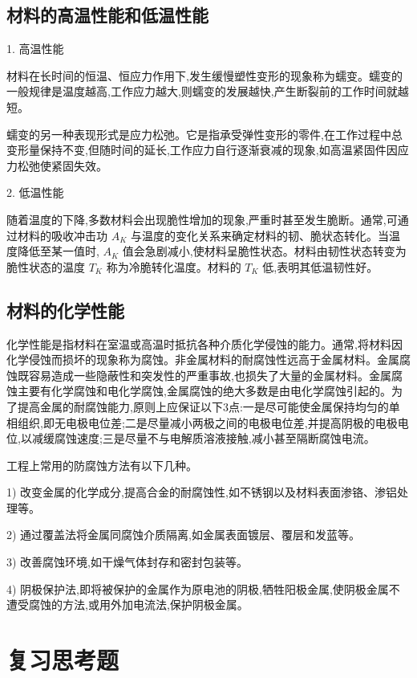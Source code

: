 \documentclass[UTF8]{ctexbook}
\newcommand{\◎}{\ensuremath{\bigcirc}}
\begin{document}
\subsection{材料的高温性能和低温性能}

1. 高温性能

材料在长时间的恒温、恒应力作用下,发生缓慢塑性变形的现象称为蠕变。蠕变的一般规律是温度越高,工作应力越大,则蠕变的发展越快,产生断裂前的工作时间就越短。

蠕变的另一种表现形式是应力松弛。它是指承受弹性变形的零件,在工作过程中总变形量保持不变,但随时间的延长,工作应力自行逐渐衰减的现象,如高温紧固件因应力松弛使紧固失效。

2. 低温性能

随着温度的下降,多数材料会出现脆性增加的现象,严重时甚至发生脆断。通常,可通过材料的吸收冲击功 $A_K$ 与温度的变化关系来确定材料的韧、脆状态转化。当温度降低至某一值时, $A_K$ 值会急剧减小,使材料呈脆性状态。材料由韧性状态转变为脆性状态的温度 $T_K$ 称为冷脆转化温度。材料的 $T_K$ 低,表明其低温韧性好。

\subsection{材料的化学性能}

化学性能是指材料在室温或高温时抵抗各种介质化学侵蚀的能力。通常,将材料因化学侵蚀而损坏的现象称为腐蚀。非金属材料的耐腐蚀性远高于金属材料。金属腐蚀既容易造成一些隐蔽性和突发性的严重事故,也损失了大量的金属材料。金属腐蚀主要有化学腐蚀和电化学腐蚀,金属腐蚀的绝大多数是由电化学腐蚀引起的。为了提高金属的耐腐蚀能力,原则上应保证以下3点:一是尽可能使金属保持均匀的单相组织,即无电极电位差;二是尽量减小两极之间的电极电位差,并提高阴极的电极电位,以减缓腐蚀速度;三是尽量不与电解质溶液接触,减小甚至隔断腐蚀电流。

工程上常用的防腐蚀方法有以下几种。

1) 改变金属的化学成分,提高合金的耐腐蚀性,如不锈钢以及材料表面渗铬、渗铝处理等。

2) 通过覆盖法将金属同腐蚀介质隔离,如金属表面镀层、覆层和发蓝等。

3) 改善腐蚀环境,如干燥气体封存和密封包装等。

4) 阴极保护法,即将被保护的金属作为原电池的阴极,牺牲阳极金属,使阴极金属不遭受腐蚀的方法,或用外加电流法,保护阴极金属。

\section*{复习思考题}
 
\end{document}
